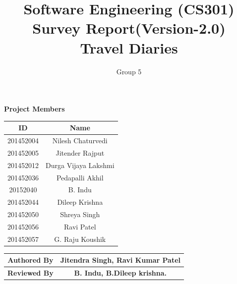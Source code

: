 \documentclass[]{article}
\title{Software Engineering (CS301)\\ Survey Report(Version-2.0)\\Travel Diaries}
\author{Group 5}
\begin{document}
\maketitle


\begin{center}
\textbf{Project Members}\\
\vspace*{.6cm}
\begin{tabular}{|c|c|}
\hline
\textbf{ID} & \textbf{Name}\\
\hline
\hline
201452004 & Nilesh Chaturvedi\\
\hline
201452005 & Jitender Rajput\\
\hline
201452012 & Durga Vijaya Lakshmi\\
\hline
201452036 & Pedapalli Akhil\\
\hline
20152040 & B. Indu\\
\hline
201452044 & Dileep Krishna\\
\hline
201452050 & Shreya Singh\\
\hline
201452056 & Ravi Patel\\
\hline
201452057 & G. Raju Koushik\\
\hline
\end{tabular}

\vspace*{1cm}

\begin{tabular}{|c|c|}
\hline
\textbf{Authored By} & \textbf{Jitendra Singh, Ravi Kumar Patel}\\
\hline
\textbf{Reviewed By} & \textbf{B. Indu, B.Dileep krishna.}\\
\hline
\end{tabular}
\end{center}
\end{document}
